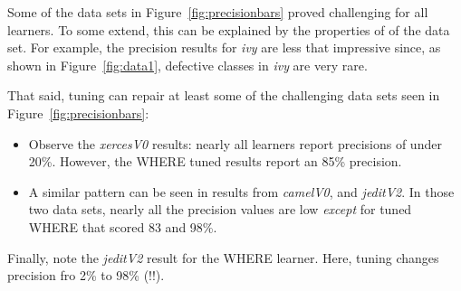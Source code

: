 \documentclass{sig-alternative}
\newcommand{\bi}{\begin{itemize}[leftmargin=0.4cm]}
\newcommand{\ei}{\end{itemize}}
\newcommand{\fig}[1]{Figure~\ref{fig:#1}}
\begin{document}
Some of the data sets in \fig{precisionbars} proved challenging for all learners.
To some extend, this can be explained by
the properties of of the data set. For example, the precision results for {\em ivy} are less
that impressive since, as shown in \fig{data1}, defective classes in {\em ivy} are very rare.

That said, tuning can repair at least some of the challenging data sets seen in \fig{precisionbars}:
\bi
\item
Observe the {\em xercesV0} results: nearly all learners report precisions of under 20\%. However,
the WHERE tuned results report an 85\% precision.  
\item A similar pattern can be seen in results from {\em camelV0},   and {\em jeditV2}.
In those two data sets, nearly all the precision values are   low {\em except} for
tuned WHERE that scored 83 and 98\%.
\ei
Finally, note the  {\em jeditV2} result for the WHERE learner.
Here, tuning changes precision fro 2\% to 98\% (!!).
\end{document}
